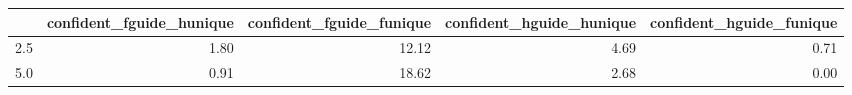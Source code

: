 \begin{tabular}{lrrrr}
\toprule
 & confident_fguide_hunique & confident_fguide_funique & confident_hguide_hunique & confident_hguide_funique \\
\midrule
2.5 & 1.80 & 12.12 & 4.69 & 0.71 \\
5.0 & 0.91 & 18.62 & 2.68 & 0.00 \\
\bottomrule
\end{tabular}
